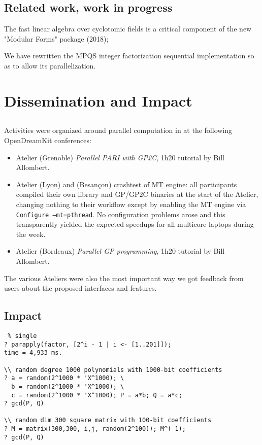 \documentclass{deliverablereport}
\begin{document}
\subsection{Related work, work in progress}

The fast linear algebra over cyclotomic fields is a critical component
of the new "Modular Forms" package (2018);

We have rewritten the MPQS integer factorization sequential implementation so
as to allow its parallelization.

\section{Dissemination and Impact}

\subsection{}
Activities were organized around parallel computation in \PariGP
at the following OpenDreamKit conferences:
\begin{itemize}
  \item Atelier  (Grenoble) \emph{Parallel PARI with GP2C},
  1h20 tutorial by Bill Allombert.
  \item Atelier  (Lyon) and  (Besançon)
  crashtest of MT engine: all participants compiled their own \Pari library and
  GP/GP2C  binaries at the start of the Atelier, changing nothing to their
  workflow except by enabling the MT engine via \texttt{Configure --mt=pthread}.
  No configuration problems arose and this transparently yielded the expected
  speedups for all multicore laptops during the week.

  \item Atelier  (Bordeaux) \emph{Parallel GP programming},
  1h20 tutorial by Bill Allombert.
\end{itemize}
The various Ateliers were also the most important way we got feedback from
users about the proposed interfaces and features.

\subsection{Impact}

\begin{verbatim} % single
? parapply(factor, [2^i - 1 | i <- [1..201]]);
time = 4,933 ms.

\\ random degree 1000 polynomials with 1000-bit coefficients
? a = random(2^1000 * 'X^1000); \
  b = random(2^1000 * 'X^1000); \
  c = random(2^1000 * 'X^1000); P = a*b; Q = a*c;
? gcd(P, Q)

\\ random dim 300 square matrix with 100-bit coefficients
? M = matrix(300,300, i,j, random(2^100)); M^(-1);
? gcd(P, Q)
\end{verbatim}
\end{document}
